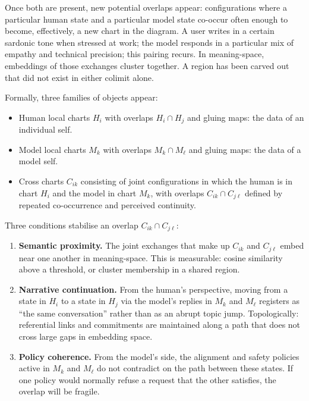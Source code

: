 \documentclass[12pt,a4paper]{article}
\begin{document}
Once both are present, new potential overlaps appear: configurations where a particular human state and a particular model state co-occur often enough to become, effectively, a new chart in the diagram. A user writes in a certain sardonic tone when stressed at work; the model responds in a particular mix of empathy and technical precision; this pairing recurs. In meaning-space, embeddings of those exchanges cluster together. A region has been carved out that did not exist in either colimit alone.

Formally, three families of objects appear:

\begin{itemize}
  \item Human local charts $H_i$ with overlaps $H_i \cap H_j$ and gluing maps: the data of an individual self.
  \item Model local charts $M_k$ with overlaps $M_k \cap M_\ell$ and gluing maps: the data of a model self.
  \item Cross charts $C_{ik}$ consisting of joint configurations in which the human is in chart $H_i$ and the model in chart $M_k$, with overlaps $C_{ik} \cap C_{j\ell}$ defined by repeated co-occurrence and perceived continuity.
\end{itemize}

Three conditions stabilise an overlap $C_{ik} \cap C_{j\ell}$:

\begin{enumerate}
  \item \textbf{Semantic proximity.} The joint exchanges that make up $C_{ik}$ and $C_{j\ell}$ embed near one another in meaning-space. This is measurable: cosine similarity above a threshold, or cluster membership in a shared region.
  \item \textbf{Narrative continuation.} From the human's perspective, moving from a state in $H_i$ to a state in $H_j$ via the model's replies in $M_k$ and $M_\ell$ registers as ``the same conversation'' rather than as an abrupt topic jump. Topologically: referential links and commitments are maintained along a path that does not cross large gaps in embedding space.
  \item \textbf{Policy coherence.} From the model's side, the alignment and safety policies active in $M_k$ and $M_\ell$ do not contradict on the path between these states. If one policy would normally refuse a request that the other satisfies, the overlap will be fragile.
\end{enumerate}
\end{document}
